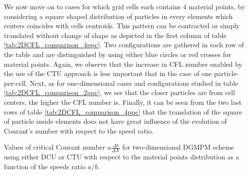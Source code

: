We now move on to cases for which grid cells each contains $4$ material points, by considering a square shaped distribution of particles in every elements which centers coincides with cells centroids. This pattern can be contracted or simply translated without change of shape as depicted in the first column of table \ref{tab:2DCFL_comparison_4ppc}. Two configurations are gathered in each row of the table and are distinguished by using either blue circles or red crosses for material points. Again, we observe that the increase in CFL number enabled by the use of the CTU approach is less important that in the case of one particle-per-cell. Next, as for one-dimensional cases and configurations studied in table \ref{tab:2DCFL_comparison_2ppc}, we see that the closer particles are from cell centers, the higher the CFL number is. Finally, it can be seen from the two last rows of table \ref{tab:2DCFL_comparison_4ppc} that the translation of the square of particle inside elements does not have great influence of the evolution of Courant's number with respect to the speed ratio. 
\begin{table}[h!]
  \centering
  
  \caption{Values of critical Courant number $a\frac{\Delta t}{\Delta X}$ for two-dimensional DGMPM scheme using either DCU or CTU with respect to the material points distribution as a function of the speeds ratio $a/b$.}
  \label{tab:2DCFL_comparison_4ppc}
\end{table}




